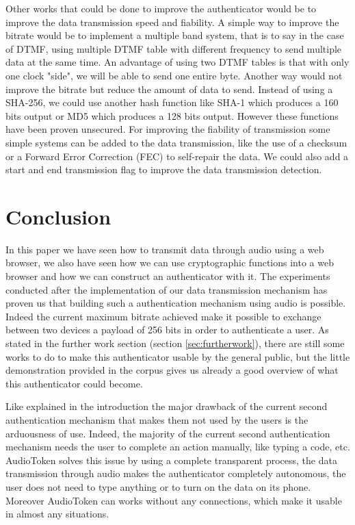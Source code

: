 \documentclass[twocolumn,14pt]{extarticle}
\begin{document}
Other works that could be done to improve the authenticator would be to improve the data transmission speed and fiability. A simple way to improve the bitrate would be to implement a multiple band system, that is to say in the case of DTMF, using multiple DTMF table with different frequency to send multiple data at the same time. An advantage of using two DTMF tables is that with only one clock "side", we will be able to send one entire byte. Another way would not improve the bitrate but reduce the amount of data to send. Instead of using a SHA-256, we could use another hash function like SHA-1 which produces a 160 bits output or MD5 which produces a 128 bits output. However these functions have been proven unsecured. For improving the fiability of transmission some simple systems can be added to the data transmission, like the use of a checksum or a Forward Error Correction (FEC) to self-repair the data. We could also add a start and end transmission flag to improve the data transmission detection.


\section{Conclusion}
\label{sec:conclusion}
In this paper we have seen how to transmit data through audio using a web browser, we also have seen how we can use cryptographic functions into a web browser and how we can construct an authenticator with it. The experiments conducted after the implementation of our data transmission mechanism has proven us that building such a authentication mechanism using audio is possible. Indeed the current maximum bitrate achieved make it possible to exchange between two devices a payload of 256 bits in order to authenticate a user. As stated in the further work section (section \ref{sec:furtherwork}), there are still some works to do to make this authenticator usable by the general public, but the little demonstration provided in the corpus gives us already a good overview of what this authenticator could become.

Like explained in the introduction the major drawback of the current second authentication mechanism that makes them not used by the users is the arduousness of use. Indeed, the majority of the current second authentication mechanism needs the user to complete an action manually, like typing a code, etc. AudioToken solves this issue by using a complete transparent process, the data transmission through audio makes the authenticator completely autonomous, the user does not need to type anything or to turn on the data on its phone. Moreover AudioToken can works without any connections, which make it usable in almost any situations.
\end{document}
